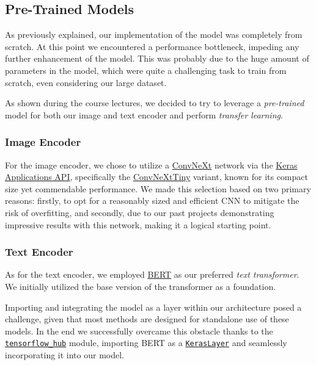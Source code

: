 \documentclass[12pt, a4paper]{article}
\begin{document}
\subsection{Pre-Trained Models}
As previously explained, our implementation of the model was completely from scratch. At this point we encountered a performance bottleneck, impeding any further enhancement of the model. This was probably due to the huge amount of parameters in the model, which were quite a challenging task to train from scratch, even considering our large dataset.

As shown during the course lectures, we decided to try to leverage a \textit{pre-trained} model for both our image and text encoder and perform \textit{transfer learning}.

\subsubsection{Image Encoder}
For the image encoder, we chose to utilize a \href{https://github.com/facebookresearch/ConvNeXt}{ConvNeXt} network via the \href{https://keras.io/api/applications/}{Keras Applications API}, specifically the \href{https://keras.io/api/applications/convnext/#convnexttiny-function}{ConvNeXtTiny} variant, known for its compact size yet commendable performance.
We made this selection based on two primary reasons: firstly, to opt for a reasonably sized and efficient CNN to mitigate the risk of overfitting, and secondly, due to our past projects demonstrating impressive results with this network, making it a logical starting point.

\subsubsection{Text Encoder}
As for the text encoder, we employed \href{https://huggingface.co/docs/transformers/model_doc/bert}{BERT} as our preferred \textit{text transformer}.
We initially utilized the base version of the transformer as a foundation.

Importing and integrating the model as a layer within our architecture posed a challenge, given that most methods are designed for standalone use of these models.
In the end we successfully overcame this obstacle thanks to the \href{https://www.tensorflow.org/hub}{\texttt{tensorflow\_hub}} module, importing BERT as a \href{https://www.tensorflow.org/hub/api_docs/python/hub/KerasLayer}{\texttt{KerasLayer}} and seamlessly incorporating it into our model.
\end{document}
